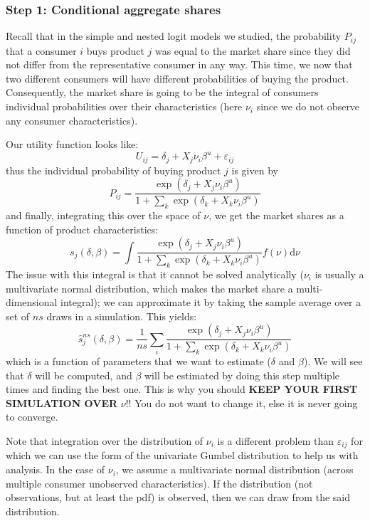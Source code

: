 \documentclass[12pt]{report}
\def\D{\mathrm{d}}
\def\D{\mathrm{d}}
\begin{document}
\subsubsection{Step 1: Conditional aggregate shares}

Recall that in the simple and nested logit models we studied, the probability $P_{ij}$ that a consumer $i$ buys product $j$ was equal to the market share since they did not differ from the representative consumer in any way. This time, we now that two different consumers will have different probabilities of buying the product. Consequently, the market share is going to be the integral of consumers individual probabilities over their characteristics (here $\nu_i$ since we do not observe any consumer characteristics).

Our utility function looks like: $$U_{ij} = \delta_j + X_j\nu_i\beta^u + \varepsilon_{ij} $$ thus the individual probability of buying product $j$ is given by $$P_{ij} = \frac{\exp(\delta_j + X_j\nu_i\beta^u)}{1 + \sum_k \exp(\delta_k + X_k\nu_i\beta^u) } $$ and finally, integrating this over the space of $\nu$, we get the market shares as a function of product characteristics: $$s_j(\delta, \beta) = \int \frac{\exp(\delta_j + X_j\nu_i\beta^u)}{1 + \sum_k \exp(\delta_k + X_k\nu_i\beta^u) } f(\nu) \D\nu $$
The issue with this integral is that it cannot be solved analytically ($\nu_i$ is usually a multivariate normal distribution, which makes the market share a multi-dimensional integral); we can approximate it by taking the sample average over a set of $ns$ draws in a simulation. This yields: $$\hat s_j^{ns}(\delta, \beta) = \frac{1}{ns} \sum_{i} \frac{\exp(\delta_j + X_j\nu_i\beta^u)}{1 + \sum_k \exp(\delta_k + X_k\nu_i\beta^u) } $$ which is a function of parameters that we want to estimate ($\delta$ and $\beta$). We will see that $\delta$ will be computed, and $\beta$ will be estimated by doing this step multiple times and finding the best one. This is why you should \textbf{KEEP YOUR FIRST SIMULATION OVER} $\nu$!! You do not want to change it, else it is never going to converge.

Note that integration over the distribution of $\nu_i$ is a different problem than $\varepsilon_{ij}$ for which we can use the form of the univariate Gumbel distribution to help us with analysis. In the case of $\nu_i$, we assume a multivariate normal distribution (across multiple consumer unobserved characteristics). If the distribution (not observations, but at least the pdf) is observed, then we can draw from the said distribution.
\end{document}
